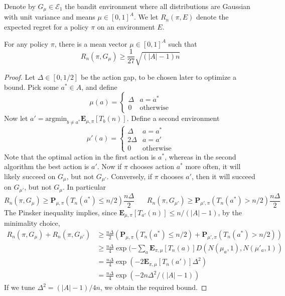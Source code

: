 Denote by $G_\mu \in \mathcal{E}_1$ the bandit environment where all distributions are Gaussian with unit variance and means $\mu \in [0,1]^A$. We let $R_n(\pi,E)$ denote the expected regret for a policy $\pi$ on an environment $E$.

\begin{theorem}
    For any policy $\pi$, there is a mean vector $\mu \in [0,1]^A$ such that
    \[ R_n(\pi, G_\mu) \geq \frac{1}{27} \sqrt{(|A| - 1) n} \]
\end{theorem}
\begin{proof}
    Let $\Delta \in [0,1/2]$ be the action gap, to be chosen later to optimize a bound. Pick some $a^* \in A$, and define
    \[ \mu(a) = \begin{cases} \Delta & a = a^* \\ 0 & \text{otherwise} \end{cases} \]
    Now let $a' = \text{argmin}_{b \neq a^*} \mathbf{E}_{\mu,\pi}[T_b(n)]$. Define a second environment
    \[ \mu'(a) = \begin{cases} \Delta & a = a^* \\ 2 \Delta & a = a' \\ 0 & \text{otherwise} \end{cases} \]
    Note that the optimal action in the first action is $a^*$, whereas in the second algorithm the best action is $a'$. Now if $\pi$ chooses action $a^*$ more often, it will likely succeed on $G_\mu$, but not $G_{\mu'}$. Conversely, if $\pi$ chooses $a'$, then it will succeed on $G_{\mu'}$, but not $G_\mu$. In particular
    \[ R_n(\pi, G_\mu) \geq \mathbf{P}_{\mu, \pi}(T_n(a^*) \leq n/2) \frac{n\Delta}{2}\ \ \ \ \ \ \ \ R_n(\pi, G_{\mu'}) \geq \mathbf{P}_{\mu', \pi}(T_n(a^*) > n/2) \frac{n\Delta}{2} \]
    The Pinsker inequality implies, since $\mathbf{E}_{\mu, \pi}[T_{a'}(n)] \leq n/(|A|-1)$, by the minimality choice,
    \begin{align*}
        R_n(\pi, G_\mu) + R_n(\pi, G_{\mu'}) &\geq \frac{n\Delta}{2} \left( \mathbf{P}_{\mu, \pi}(T_n(a^*) \leq n/2) + \mathbf{P}_{\mu', \pi}(T_n(a^*) > n/2) \right)\\
        &\geq \frac{n \Delta}{4} \exp(- \sum_a \mathbf{E}_{\pi, \mu} [T_n(a)] D(N(\mu_a,1), N(\mu'_a,1))\\
        &= \frac{n \Delta}{4} \exp( - 2 \mathbf{E}_{\pi, \mu}[T_n(a')] \Delta^2 )\\
        &= \frac{n \Delta}{4} \exp( - 2n \Delta^2/(|A| - 1) )
    \end{align*}
    If we tune $\Delta^2 = (|A|-1)/4n$, we obtain the required bound.
\end{proof}

